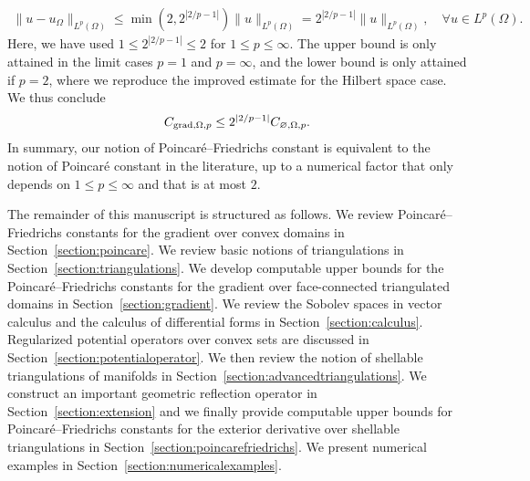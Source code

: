 \documentclass[10pt,a4paper]{article}
\begin{document}
\begin{align*}
    \| u - u_\Omega \|_{L^{p}(\Omega)}
    \leq 
    \min\left( 2, 2^{|2/p-1|} \right)
    \| u \|_{L^{p}(\Omega)}
    = 
    2^{|2/p-1|} 
    \| u \|_{L^{p}(\Omega)}
    ,
    \quad 
    \forall 
    u \in L^{p}(\Omega)
    .
\end{align*}
Here, we have used $1 \leq 2^{|2/p-1|} \leq 2$ for $1 \leq p \leq \infty$.
The upper bound is only attained in the limit cases $p = 1$ and $p = \infty$, and the lower bound is only attained if $p = 2$, where we reproduce the improved estimate for the Hilbert space case.
We thus conclude 
\begin{align}\label{math:p_vs_pf}
    C_{\operatorname{grad},\Omega,p} \leq 2^{|2/p-1|} C_{\varnothing,\Omega,p}.
\end{align}
In summary, our notion of Poincar\'e--Friedrichs constant is equivalent to the notion of Poincar\'e constant in the literature, up to a numerical factor that only depends on $1 \leq p \leq \infty$ and that is at most $2$.





















The remainder of this manuscript is structured as follows.
We review Poincar\'e--Friedrichs constants for the gradient over convex domains in Section~\ref{section:poincare}.
We review basic notions of triangulations in Section~\ref{section:triangulations}.
We develop computable upper bounds for the Poincar\'e--Friedrichs constants for the gradient over face-connected triangulated domains in Section~\ref{section:gradient}.
We review the Sobolev spaces in vector calculus and the calculus of differential forms in Section~\ref{section:calculus}.
Regularized potential operators over convex sets are discussed in Section~\ref{section:potentialoperator}.
We then review the notion of shellable triangulations of manifolds in Section~\ref{section:advancedtriangulations}.
We construct an important geometric reflection operator in Section~\ref{section:extension}
and we finally provide computable upper bounds for Poincar\'e--Friedrichs constants for the exterior derivative over shellable triangulations in Section~\ref{section:poincarefriedrichs}.
We present numerical examples in Section~\ref{section:numericalexamples}. 
\end{document}
